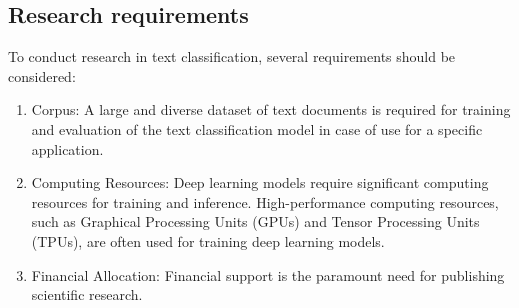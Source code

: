 \subsection{Research requirements}
To conduct research in text classification, several requirements should be considered:

\begin{enumerate}
\item Corpus: A large and diverse dataset of text documents is required for training and evaluation of the text classification model in case of use for a specific application.
\item Computing Resources: Deep learning models require significant computing resources for training and inference. High-performance computing resources, such as Graphical Processing Units (GPUs) and Tensor Processing Units (TPUs), are often used for training deep learning models.
\item Financial Allocation: Financial support is the paramount need for publishing scientific research.
\end{enumerate}